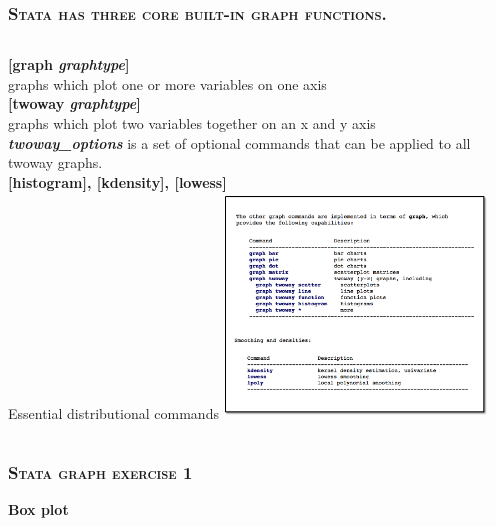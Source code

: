 \documentclass[10pt]{beamer}
\begin{document}
	\begin{frame}
	\frametitle{\textsc{Stata has three core built-in graph functions.}}
		\begin{columns}
			\textbf{[graph \textit{graphtype}]} \\
			\small graphs which plot one or more variables on one axis \\ \vspace{2mm}
			\textbf{[twoway \textit{graphtype}]} \\
			\small graphs which plot two variables together on an x and y axis \\  \vspace{2mm}
			\small \textbf{\textit{twoway\_options}} is a set of optional commands that can be
					applied to all twoway graphs. \\
			\textbf{[histogram], [kdensity], [lowess]} \\
			\small Essential distributional commands
			\includegraphics[height=6cm, width=7cm]{stata_builtin_graph_functions}
		\end{columns}
	\end{frame}
	
	\begin{frame}
	\frametitle{\textsc{Stata graph exercise 1}}
		\begin{center}
		\Large \textbf{Box plot}
		\end{center}
	\end{frame}	
\end{document}
